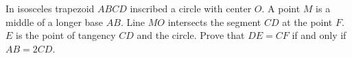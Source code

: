 \problem
In isosceles trapezoid $ABCD$ inscribed a circle with center $O$.
A point $M$ is a middle of a longer base $AB$.
Line $MO$ intersects the segment $CD$ at the point $F$.
$E$ is the point of tangency $CD$ and the circle.
Prove that $DE = CF$ if and only if $AB = 2 CD$.

\solution

\endproblem
